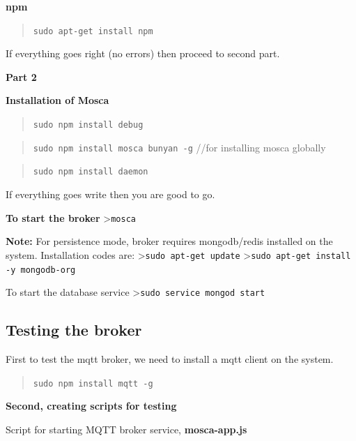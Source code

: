 \documentclass[16pt]{article}
\begin{document}
\textbf{npm}

\begin{quote}
\texttt{sudo apt-get install npm}
\end{quote}

If everything goes right (no errors) then proceed to second part.

 \vspace{0.3cm}

\textbf{Part 2}

\textbf{Installation of Mosca}

\begin{quote}
\texttt{sudo npm install debug}
\end{quote}

\begin{quote}
\texttt{sudo npm install mosca bunyan -g} //for installing mosca
globally
\end{quote}

\begin{quote}
\texttt{sudo npm install daemon}
\end{quote}



If everything goes write then you are good to go.

 \vspace{0.3cm}

\textbf{To start the broker} \textgreater{}\texttt{mosca}

\textbf{Note:} For persistence mode, broker requires mongodb/redis
installed on the system. Installation codes are:
\textgreater{}\texttt{sudo apt-get update}
\textgreater{}\texttt{sudo apt-get install -y mongodb-org}

To start the database service
\textgreater{}\texttt{sudo service mongod start}


 \vspace{0.5cm}

\subsection{Testing the broker}

First to test the mqtt broker, we need to install a mqtt client on the
system.

\begin{quote}
\texttt{sudo npm install mqtt -g}
\end{quote}

\textbf{Second, creating scripts for testing}

Script for starting MQTT broker service, \textbf{mosca-app.js}
\end{document}
